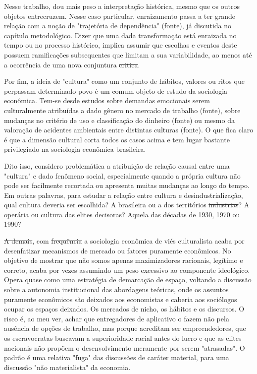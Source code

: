 Nesse trabalho, dou mais peso a interpretação histórica, mesmo que os outros objetos entrecruzem. Nesse caso particular, enraizamento passa a ter grande relação com a noção de "trajetória de dependência" (fonte), já discutida no capítulo metodológico. Dizer que uma dada transformação está enraizada no tempo ou no processo histórico, implica assumir que escolhas e eventos deste possuem ramificações subsequentes que limitam a sua variabilidade, ao menos até a ocorrência de uma nova conjuntura \sout{critica}.

Por fim, a ideia de "cultura" como um conjunto de hábitos, valores ou ritos que perpassam determinado povo é um comum objeto de estudo da sociologia econômica. Tem-se desde estudos sobre demandas emocionais serem culturalmente atribuídas a dado gênero no mercado de trabalho (fonte), sobre mudanças no critério de uso e classificação do dinheiro (fonte) ou mesmo da valoração de acidentes ambientais entre distintas culturas (fonte). O que fica claro é que a dimensão cultural corta todos os casos acima e tem lugar bastante privilegiado
na sociologia econômica brasileira.

Dito isso, considero problemática a atribuição de relação causal entre uma "cultura" e dado fenômeno social, especialmente quando a própria cultura não pode ser facilmente recortada ou apresenta muitas mudanças ao longo do tempo. Em outras palavras, para estudar a relação entre cultura e desindustrialização, qual cultura deveria ser escolhida? A brasileira ou a dos territórios \sout{industrias}? A operária ou cultura das elites decisoras? Aquela das décadas de 1930, 1970 ou 1990? 

\sout{A demais}, com \sout{frequẽncia} a sociologia econômica de viés culturalista
acaba por desenfatizar mecanismos de mercado ou fatores puramente econômicos. No objetivo de mostrar que não somos apenas maximizadores racionais, legítimo e correto, acaba por vezes assumindo um peso excessivo ao componente ideológico. Opera quase como uma estratégia de demarcação de espaço, voltando a discussão sobre a autonomia institucional das abordagens teóricas, onde os assuntos puramente econômicos são deixados aos economistas e caberia aos sociólogos ocupar os espaços deixados. Os mercados de nicho, os hábitos e os discursos. O risco é, ao meu ver, achar que entregadores de aplicativo o fazem não pela ausência de opções de trabalho, mas porque acreditam ser empreendedores, que os escravocratas buscavam
a superioridade racial antes do lucro e que as elites nacionais não
propõem o desenvolvimento meramente por serem "atrasadas". O padrão é uma relativa "fuga" das discussões de caráter material, para uma discussão "não materialista" da economia.

